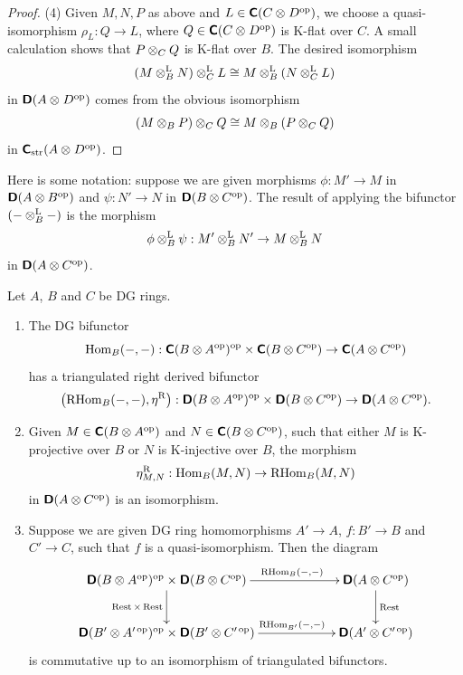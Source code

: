 \begin{proof}
\medskip \noindent 
(4) Given $M, N, P$ as above and 
$L \in \boldsymbol{\mathsf{C}}(C \otimes_{} D^{\mathrm{op}})$, 
we choose a quasi-iso\-morphism 
$\rho_L : Q \to L$, where 
$Q \in \boldsymbol{\mathsf{C}}(C \otimes_{} D^{\mathrm{op}})$
is K-flat over $C$. A small calculation shows that 
$P \otimes_C Q$ is K-flat over $B$. The desired isomorphism 
\[ (M \otimes^{\mathrm{L}}_{B} N) \otimes^{\mathrm{L}}_{C} L \cong  
M \otimes^{\mathrm{L}}_{B} (N \otimes^{\mathrm{L}}_{C} L) \]
in $\boldsymbol{\mathsf{D}}(A \otimes_{} D^{\mathrm{op}})$
comes from the obvious isomorphism 
\[ (M \otimes_{B} P) \otimes_{C} Q \cong  
M \otimes_{B} (P \otimes_{C} Q) \]
in $\boldsymbol{\mathsf{C}}_{\mathrm{str}}(A \otimes_{} D^{\mathrm{op}})$.
\end{proof}

Here is some notation: suppose we are given morphisms 
$\phi : M' \to M$ in 
$\boldsymbol{\mathsf{D}}(A \otimes B^{\mathrm{op}})$
and $\psi : N' \to N$ in $\boldsymbol{\mathsf{D}}(B \otimes C^{\mathrm{op}})$.
The result of applying the bifunctor $(- \otimes_B^{\mathrm{L}} -)$ is the morphism
\begin{equation} \label{eqn:3475}  
 \phi \otimes^{\mathrm{L}}_B \psi : M' \otimes_B^{\mathrm{L}} N' \to M \otimes_B^{\mathrm{L}} N
\end{equation}
in $\boldsymbol{\mathsf{D}}(A \otimes C^{\mathrm{op}})$. 

\begin{prop} \label{prop:1031}
Let $A$, $B$ and $C$ be DG rings. 
\begin{enumerate}
\item The DG bifunctor 
\[ \operatorname{Hom}_B(-, -) :  \boldsymbol{\mathsf{C}}(B \otimes A^{\mathrm{op}})^{\mathrm{op}} \times 
\boldsymbol{\mathsf{C}}(B \otimes C^{\mathrm{op}}) \to \boldsymbol{\mathsf{C}}(A \otimes C^{\mathrm{op}})  \]
has a triangulated right derived bifunctor 
\[ \bigl( \operatorname{RHom}_B(-, -), \eta^{\mathrm{R}} \bigr) :  
\boldsymbol{\mathsf{D}}(B \otimes A^{\mathrm{op}})^{\mathrm{op}} \times 
\boldsymbol{\mathsf{D}}(B \otimes C^{\mathrm{op}}) \to \boldsymbol{\mathsf{D}}(A \otimes C^{\mathrm{op}}) . \]

\item Given $M \in \boldsymbol{\mathsf{C}}(B \otimes A^{\mathrm{op}})$
and $N \in \boldsymbol{\mathsf{C}}(B \otimes C^{\mathrm{op}})$,
such that either $M$ is K-projective over $B$ or $N$ is K-injective over $B$, 
the morphism 
\[ \eta^{\mathrm{R}}_{M, N} : \operatorname{Hom}_B(M, N) \to \operatorname{RHom}_B(M, N) \]
in $\boldsymbol{\mathsf{D}}(A \otimes C^{\mathrm{op}})$ is an isomorphism. 

\item Suppose we are given DG ring homomorphisms 
$A' \to A$, $f : B' \to B$ and $C' \to C$, such that $f$ is a 
quasi-isomorphism. 
Then the diagram 
\[ \UseTips \xymatrix @C=14ex @R=6ex {
\dcat{D}(B \ot A^{\mrm{op}})^{\mrm{op}} \times \dcat{D}(B \ot C^{\mrm{op}})
\ar[r]^(0.6){ \opn{RHom}_B(-, -) }
\ar[d]_{\opn{Rest} \times \opn{Rest}}
&
\dcat{D}(A \ot C^{\mrm{op}})
\ar[d]^{\opn{Rest}}
\\
\dcat{D}(B' \ot A'^{\, \mrm{op}})^{\mrm{op}} \times 
\dcat{D}(B' \ot C'^{\, \mrm{op}})
\ar[r]^(0.6){ \opn{RHom}_{B'}(-, -) }
&
\dcat{D}(A' \ot C'^{\, \mrm{op}})
} \]
is commutative up to an isomorphism of triangulated bifunctors. 
\end{enumerate}
\end{prop}

